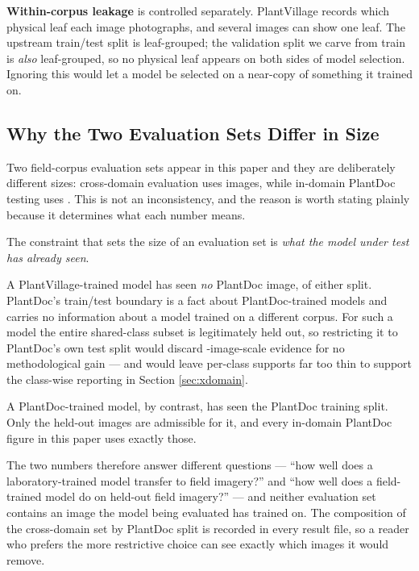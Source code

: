 \documentclass[runningheads]{llncs}
\begin{document}
\textbf{Within-corpus leakage} is controlled separately. PlantVillage records
which physical leaf each image photographs, and several images can show one
leaf. The upstream train/test split is leaf-grouped; the validation split we
carve from train is \emph{also} leaf-grouped, so no physical leaf appears on
both sides of model selection. Ignoring this would let a model be selected on a
near-copy of something it trained on.

\subsection{Why the Two Evaluation Sets Differ in Size}
\label{sec:two-eval-sets}

Two field-corpus evaluation sets appear in this paper and they are deliberately
different sizes: cross-domain evaluation uses \NXdImages{} images, while
in-domain PlantDoc testing uses \NPdcTest{}. This is not an inconsistency, and
the reason is worth stating plainly because it determines what each number
means.

The constraint that sets the size of an evaluation set is \emph{what the model
under test has already seen}.

A PlantVillage-trained model has seen \emph{no} PlantDoc image, of either split.
PlantDoc's train/test boundary is a fact about PlantDoc-trained models and
carries no information about a model trained on a different corpus. For such a
model the entire shared-class subset is legitimately held out, so restricting it
to PlantDoc's own test split would discard \NPdcTest{}-image-scale evidence for
no methodological gain --- and would leave per-class supports far too thin to
support the class-wise reporting in Section \ref{sec:xdomain}.

A PlantDoc-trained model, by contrast, has seen the PlantDoc training split.
Only the \NPdcTest{} held-out images are admissible for it, and every in-domain
PlantDoc figure in this paper uses exactly those.

The two numbers therefore answer different questions --- ``how well does a
laboratory-trained model transfer to field imagery?'' and ``how well does a
field-trained model do on held-out field imagery?'' --- and neither evaluation
set contains an image the model being evaluated has trained on. The composition
of the cross-domain set by PlantDoc split is recorded in every result file, so a
reader who prefers the more restrictive choice can see exactly which images it
would remove.
\end{document}
